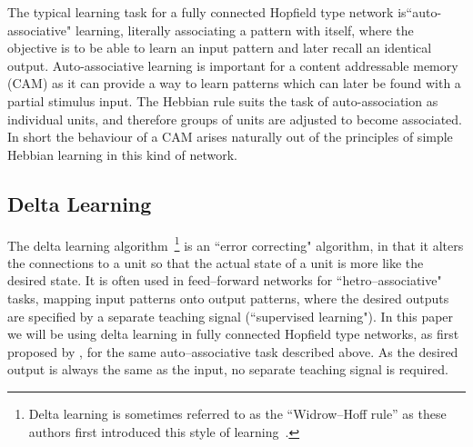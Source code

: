 The typical learning task for a fully connected Hopfield type network is``auto-associative" learning, literally associating a pattern with itself, where the objective is to be able to learn an input pattern and later recall an identical output.  Auto-associative learning is important for a content addressable memory (CAM) as it can provide a way to learn patterns which can later be found with a partial stimulus input.  The Hebbian rule suits the task of auto-association as individual units, and therefore groups of units are adjusted to become associated.  In short the behaviour of a CAM arises naturally out of the principles of simple Hebbian learning in this kind of network.


\subsection{Delta Learning}   %
\label{sec:deltaLearning}

The delta learning algorithm~\citep{etc;;;}\footnote{Delta learning is sometimes referred to as the ``Widrow--Hoff rule'' as these authors first introduced this style of learning~\citep{Widrow1960}.} is an ``error correcting" algorithm, in that it alters the connections to a unit so that the actual state of a unit is more like the desired state.  It is often used in feed--forward networks for ``hetro--associative" tasks, mapping input patterns onto output patterns, where the desired outputs are specified by a separate teaching signal (``supervised learning").  In this paper we will be using delta learning in fully connected Hopfield type networks, as first proposed by \citet{Diederich1987}, for the same auto--associative task described above.  As the desired output is always the same as the input, no separate teaching signal is required.

